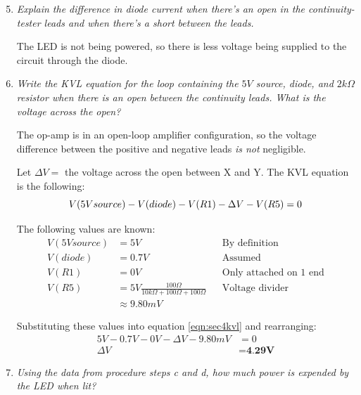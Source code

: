 \documentclass[12pt]{article}
\begin{document}
\begin{enumerate}
    \setcounter{enumi}{4}
    \item {
        \textit{Explain the difference in diode current when there's an open in the continuity-tester leads 
        and when there's a short between the leads.}
        
        The LED is not being powered, so there is less voltage being supplied to the circuit through the diode.
    }   
    \item{
        \textit{Write the KVL equation for the loop containing the $5V$ source, diode, and $2k\Omega$ 
        resistor when there is an open between the continuity leads. What is the voltage across the open?}
    
        The op-amp is in an open-loop amplifier configuration, so the voltage difference between the positive and 
        negative leads \textit{is not} negligible.

        Let $\Delta V = $ the voltage across the open between X and Y. The KVL equation is the following:
        \begin{equation}
            \label{eqn:sec4kvl}
            V(5V source) - V(diode) - V(R1) - \Delta V - V(R5) = 0  \\
        \end{equation}

        The following values are known:
        \begin{equation}
            \begin{aligned}
                V(5V source) &= 5V && \text{By definition} \\
                V(diode) &= 0.7V && \text{Assumed} \\
                V(R1) &= 0V && \text{Only attached on 1 end} \\
                V(R5) &= 5V \frac{100\Omega}{10k\Omega + 100\Omega + 100\Omega}  && \text{Voltage divider} \\
                &\approx 9.80mV
            \end{aligned}
        \end{equation}

        Substituting these values into equation \ref{eqn:sec4kvl} and rearranging:
        \begin{equation}
            \begin{aligned}
                5V - 0.7V - 0V - \Delta V - 9.80mV &= 0 \\
                \Delta V &= \textbf{4.29V} 
            \end{aligned}
        \end{equation}
    }
    \item {
        \textit{Using the data from procedure steps c and d, how much power is expended by the LED when lit?}
     
}
\end{enumerate}
\end{document}
